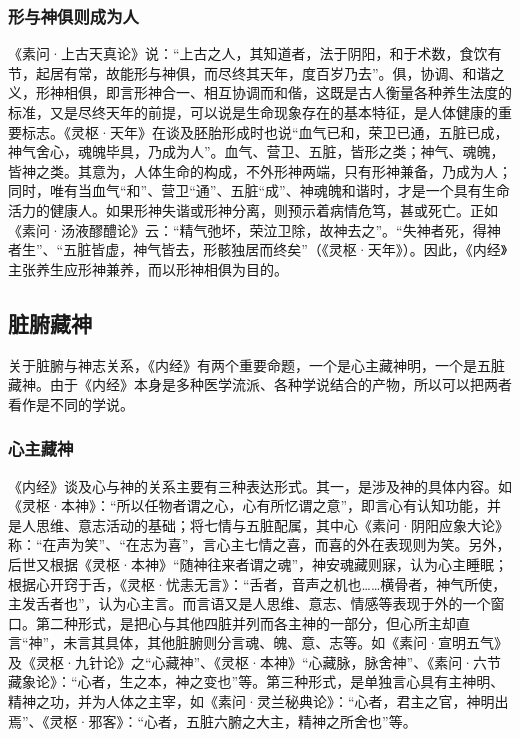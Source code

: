 \documentclass[12pt]{ctexbook}
\begin{document}
\subsubsection{形与神俱则成为人}%

《素问·上古天真论》说：“上古之人，其知道者，法于阴阳，和于术数，食饮有节，起居有常，故能形与神俱，而尽终其天年，度百岁乃去”。俱，协调、和谐之义，形神相俱，即言形神合一、相互协调而和偕，这既是古人衡量各种养生法度的标准，又是尽终天年的前提，可以说是生命现象存在的基本特征，是人体健康的重要标志。《灵枢·天年》在谈及胚胎形成时也说“血气已和，荣卫已通，五脏已成，神气舍心，魂魄毕具，乃成为人”。血气、营卫、五脏，皆形之类；神气、魂魄，皆神之类。其意为，人体生命的构成，不外形神两端，只有形神兼备，乃成为人；同时，唯有当血气“和”、营卫“通”、五脏“成”、神魂魄和谐时，才是一个具有生命活力的健康人。如果形神失谐或形神分离，则预示着病情危笃，甚或死亡。正如《素问·汤液醪醴论》云：“精气弛坏，荣泣卫除，故神去之”。“失神者死，得神者生”、“五脏皆虚，神气皆去，形骸独居而终矣”（《灵枢·天年》）。因此，《内经》主张养生应形神兼养，而以形神相俱为目的。

\subsection{脏腑藏神}%

关于脏腑与神志关系，《内经》有两个重要命题，一个是心主藏神明，一个是五脏藏神。由于《内经》本身是多种医学流派、各种学说结合的产物，所以可以把两者看作是不同的学说。

\subsubsection{心主藏神}%

《内经》谈及心与神的关系主要有三种表达形式。其一，是涉及神的具体内容。如《灵枢·本神》：“所以任物者谓之心，心有所忆谓之意”，即言心有认知功能，并是人思维、意志活动的基础；将七情与五脏配属，其中心《素问·阴阳应象大论》称：“在声为笑”、“在志为喜”，言心主七情之喜，而喜的外在表现则为笑。另外，后世又根据《灵枢·本神》“随神往来者谓之魂”，神安魂藏则寐，认为心主睡眠；根据心开窍于舌，《灵枢·忧恚无言》：“舌者，音声之机也……横骨者，神气所使，主发舌者也”，认为心主言。而言语又是人思维、意志、情感等表现于外的一个窗口。第二种形式，是把心与其他四脏并列而各主神的一部分，但心所主却直言“神”，未言其具体，其他脏腑则分言魂、魄、意、志等。如《素问·宣明五气》及《灵枢·九针论》之“心藏神”、《灵枢·本神》“心藏脉，脉舍神”、《素问·六节藏象论》：“心者，生之本，神之变也”等。第三种形式，是单独言心具有主神明、精神之功，并为人体之主宰，如《素问·灵兰秘典论》：“心者，君主之官，神明出焉”、《灵枢·邪客》：“心者，五脏六腑之大主，精神之所舍也”等。
\end{document}
